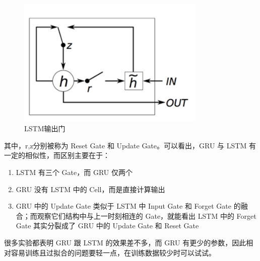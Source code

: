 \begin{enumerate}
		\begin{figure}[h]
			\centering
			\includegraphics[width=0.8\textwidth]{./Tex_files/gru1.png}
			\caption{LSTM输出门}
		\end{figure}
		其中，r,z分别被称为 Reset Gate 和 Update Gate。可以看出，GRU 与 LSTM 有一定的相似性，而区别主要在于：
		\begin{enumerate}
			\item LSTM 有三个 Gate，而 GRU 仅两个
			\item GRU 没有 LSTM 中的 Cell，而是直接计算输出
			\item GRU 中的 Update Gate 类似于 LSTM 中 Input Gate 和 Forget Gate 的融合；而观察它们结构中与上一时刻相连的 Gate，就能看出 LSTM 中的 Forget Gate 其实分裂成了 GRU 中的 Update Gate 和 Reset Gate
		\end{enumerate}		
		很多实验都表明 GRU 跟 LSTM 的效果差不多，而 GRU 有更少的参数，因此相对容易训练且过拟合的问题要轻一点，在训练数据较少时可以试试。
	
\end{enumerate}
